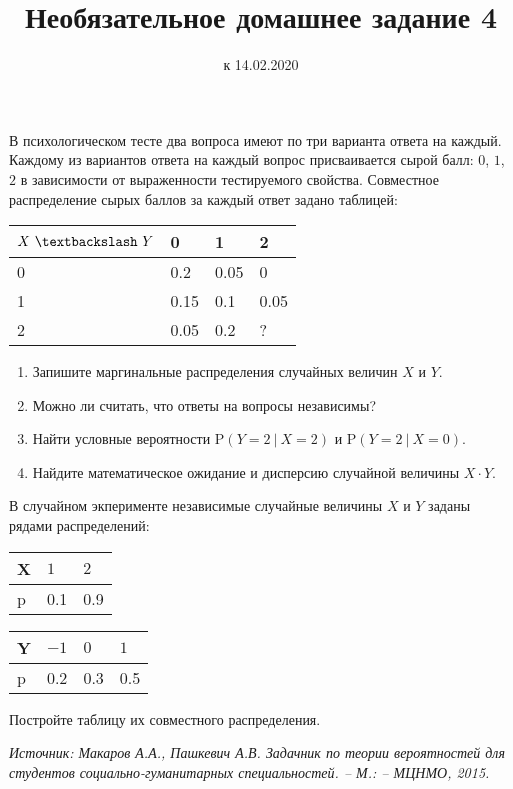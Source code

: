 \documentclass[a4paper, 12pt]{article}
\title{Необязательное домашнее задание 4}
\date{к 14.02.2020}
\begin{document}
\begin{problem}
В психологическом тесте два  вопроса имеют по три варианта 
ответа на каждый. Каждому из вариантов ответа на каждый вопрос 
присваивается сырой балл: $0$, $1$, $2$ в зависимости от выраженности 
тестируемого свойства. Совместное распределение сырых баллов за 
каждый ответ  задано таблицей:
		
\begin{table}[ht!]
\centering
\begin{tabular}{|l|l|l|l|}
	\hline
	$X~\textbackslash~Y$	& 0 & 1 & 2 \\ \hline
	0	& 0.2 & 0.05 & 0 \\ \hline
	1	& 0.15 & 0.1 & 0.05 \\ \hline
	2	& 0.05 & 0.2 & ? \\ \hline
\end{tabular}
\end{table}

\begin{enumerate}
\item Запишите маргинальные распределения случайных величин $X$ и $Y$.
\item Можно ли считать, что ответы на вопросы независимы? 
\item Найти условные вероятности $\text{P}(Y=2~|~X=2)$ и $\text{P}(Y=2~|~X=0)$. 
\item Найдите математическое ожидание и дисперсию случайной величины $X\cdot Y$.
\end{enumerate}
\end{problem}

\begin{problem}
В случайном экперименте независимые случайные величины $X$ и $Y$ 
заданы рядами распределений:

\begin{center}
\begin{tabular}{|l|l|l|}
\hline
X & $1$ & $2$\\
\hline
p & 0.1 & 0.9 \\
\hline
\end{tabular} \hspace{1cm}
\begin{tabular}{|l|l|l|l|}
\hline
Y & $-1$ & $0$ & $1$\\
\hline
p & 0.2 & 0.3 & 0.5 \\
\hline
\end{tabular}
\end{center}

Постройте таблицу их совместного распределения.

\end{problem}


\noindent\textit{Источник: Макаров А.А., Пашкевич А.В. Задачник по теории вероятностей для 
студентов социально-гуманитарных специальностей. -- М.: -- МЦНМО, 2015.}
\end{document}
